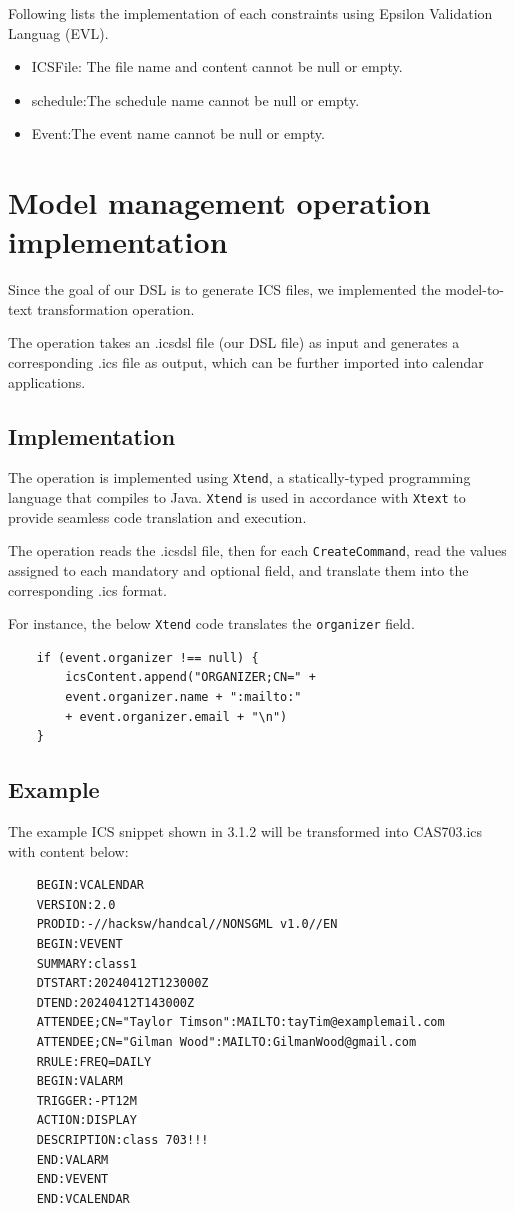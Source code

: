 \documentclass[12pt, letterpaper, twoside]{article}
\begin{document}
Following lists the implementation of each constraints using Epsilon Validation Languag (EVL).
\begin{itemize}
    \item ICSFile: The file name and content cannot be null or empty.    
    \item schedule:The schedule name cannot be null or empty.
    \item Event:The event name cannot be null or empty. 
\end{itemize}

\newpage
\section{Model management operation implementation}
Since the goal of our DSL is to generate ICS files, we implemented the model-to-text transformation operation. 

The operation takes an .icsdsl file (our DSL file) as input and generates a corresponding .ics file as output, which can be further imported into calendar applications.

\subsection{Implementation}

The operation is implemented using \texttt{Xtend}, a statically-typed programming language that compiles to Java. 
\texttt{Xtend} is used in accordance with \texttt{Xtext} to provide seamless code translation and execution. 

The operation reads the .icsdsl file, then for each \texttt{CreateCommand}, read the values assigned to each mandatory and optional field, and translate them into the corresponding .ics format.

For instance, the below \texttt{Xtend} code translates the \texttt{organizer} field.
\begin{verbatim}
    if (event.organizer !== null) {
        icsContent.append("ORGANIZER;CN=" + 
        event.organizer.name + ":mailto:" 
        + event.organizer.email + "\n")
    }
\end{verbatim}

\subsection{Example}
The example ICS snippet shown in 3.1.2 will be transformed into CAS703.ics with content below:
\begin{verbatim}
    BEGIN:VCALENDAR
    VERSION:2.0
    PRODID:-//hacksw/handcal//NONSGML v1.0//EN
    BEGIN:VEVENT
    SUMMARY:class1
    DTSTART:20240412T123000Z
    DTEND:20240412T143000Z
    ATTENDEE;CN="Taylor Timson":MAILTO:tayTim@examplemail.com
    ATTENDEE;CN="Gilman Wood":MAILTO:GilmanWood@gmail.com
    RRULE:FREQ=DAILY
    BEGIN:VALARM
    TRIGGER:-PT12M
    ACTION:DISPLAY
    DESCRIPTION:class 703!!!
    END:VALARM
    END:VEVENT
    END:VCALENDAR
\end{verbatim}
\end{document}
